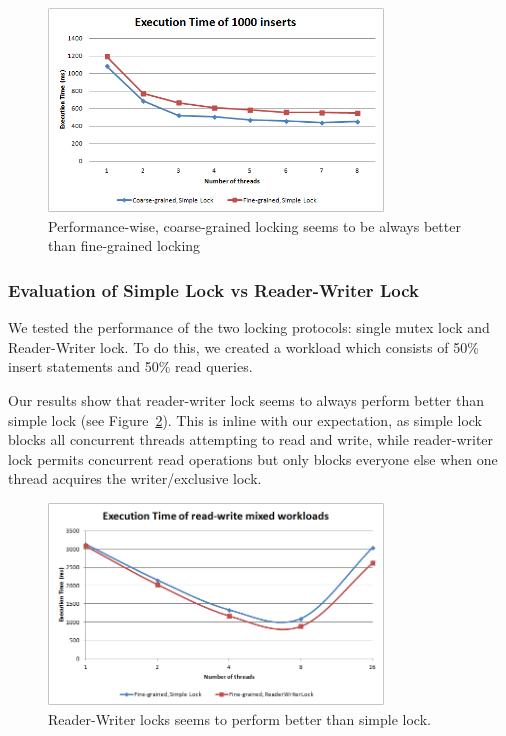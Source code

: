 \documentclass[11pt,journal,compsoc]{IEEEtran}
\begin{document}
\begin{figure}[!t]
\centering
\includegraphics[width=3.5in]{images/execution_thousand_inserts}
\caption{Performance-wise, coarse-grained locking seems to be always better than fine-grained locking}
\label{fig:thousand_inserts}
\end{figure}


\subsubsection{Evaluation of Simple Lock vs Reader-Writer Lock}
We tested the performance of the two locking protocols: single mutex lock and Reader-Writer lock. To do this, we created a workload which consists of 50\% insert statements and 50\% read queries. 

Our results show that reader-writer lock seems to always perform better than simple lock (see Figure~\ref{fig:mixed_load}). This is inline with our expectation, as simple lock blocks all concurrent threads attempting to read and write, while reader-writer lock permits concurrent read operations but only blocks everyone else when one thread acquires the writer/exclusive lock.

\begin{figure}[!t]
\centering
\includegraphics[width=3.5in]{images/mixed_load}
\caption{Reader-Writer locks seems to perform better than simple lock.}
\label{fig:mixed_load}
\end{figure}
\end{document}
